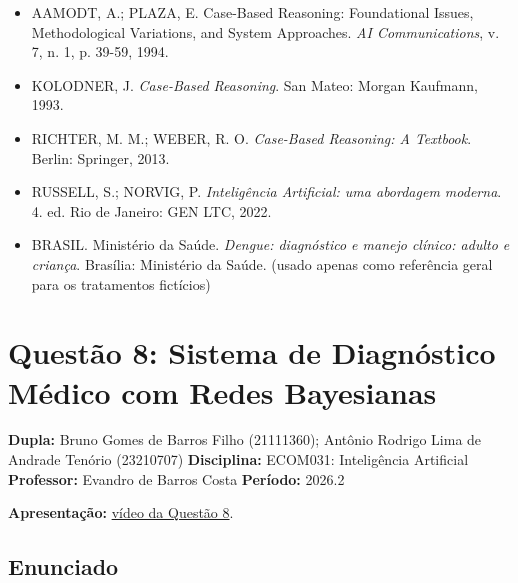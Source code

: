 \documentclass[12pt, a4paper]{article}
\providecommand{\tightlist}{%
  \setlength{\itemsep}{0pt}\setlength{\parskip}{0pt}}
\begin{document}
\begin{itemize}
\tightlist
\item
  AAMODT, A.; PLAZA, E. Case-Based Reasoning: Foundational Issues, Methodological Variations, and System Approaches. \emph{AI Communications}, v. 7, n. 1, p. 39-59, 1994.
\item
  KOLODNER, J. \emph{Case-Based Reasoning}. San Mateo: Morgan Kaufmann, 1993.
\item
  RICHTER, M. M.; WEBER, R. O. \emph{Case-Based Reasoning: A Textbook}. Berlin: Springer, 2013.
\item
  RUSSELL, S.; NORVIG, P. \emph{Inteligência Artificial: uma abordagem moderna}. 4. ed. Rio de Janeiro: GEN LTC, 2022.
\item
  BRASIL. Ministério da Saúde. \emph{Dengue: diagnóstico e manejo clínico: adulto e criança}. Brasília: Ministério da Saúde. (usado apenas como referência geral para os tratamentos fictícios)
\end{itemize}

\section{Questão 8: Sistema de Diagnóstico Médico com Redes Bayesianas}
\label{sec:q8}

\textbf{Dupla:} Bruno Gomes de Barros Filho (21111360); Antônio Rodrigo Lima de Andrade Tenório (23210707) \textbf{Disciplina:} ECOM031: Inteligência Artificial \textbf{Professor:} Evandro de Barros Costa \textbf{Período:} 2026.2

\textbf{Apresentação:} \href{https://drive.google.com/file/d/1UIWX-2w4TzcJlKA28wIOey4JuVPxbaLm/view?usp=drive_link}{vídeo da Questão 8}.

\subsection{Enunciado}\label{enunciado}
\end{document}
